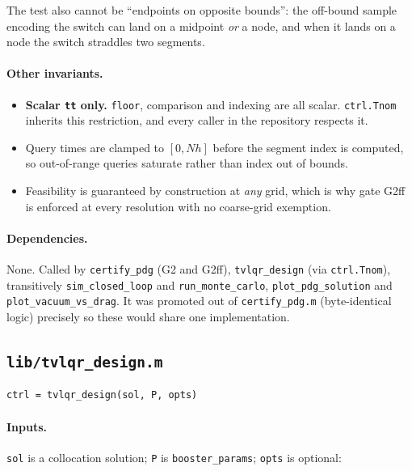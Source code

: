 \documentclass[11pt]{article}
\newcommand{\file}[1]{\texttt{#1}}
\begin{document}
The test also cannot be ``endpoints on opposite bounds'': the off-bound
sample encoding the switch can land on a midpoint \emph{or} a node, and when
it lands on a node the switch straddles two segments.

\paragraph{Other invariants.}
\begin{itemize}
\item \textbf{Scalar \texttt{tt} only.} \texttt{floor}, comparison and
indexing are all scalar. \texttt{ctrl.Tnom} inherits this restriction, and
every caller in the repository respects it.
\item Query times are clamped to $[0, Nh]$ before the segment index is
computed, so out-of-range queries saturate rather than index out of bounds.
\item Feasibility is guaranteed by construction at \emph{any} grid, which is
why gate G2ff is enforced at every resolution with no coarse-grid exemption.
\end{itemize}

\paragraph{Dependencies.} None. Called by \texttt{certify\_pdg} (G2 and
G2ff), \texttt{tvlqr\_design} (via \texttt{ctrl.Tnom}), transitively
\texttt{sim\_closed\_loop} and \texttt{run\_monte\_carlo},
\texttt{plot\_pdg\_solution} and \texttt{plot\_vacuum\_vs\_drag}. It was
promoted out of \file{certify\_pdg.m} (byte-identical logic) precisely so
these would share one implementation.

\subsection{\texttt{lib/tvlqr\_design.m}}
\label{sec:mod:tvlqr}

\begin{verbatim}
ctrl = tvlqr_design(sol, P, opts)
\end{verbatim}

\paragraph{Inputs.} \texttt{sol} is a collocation solution;
\texttt{P} is \texttt{booster\_params}; \texttt{opts} is optional:
\end{document}
